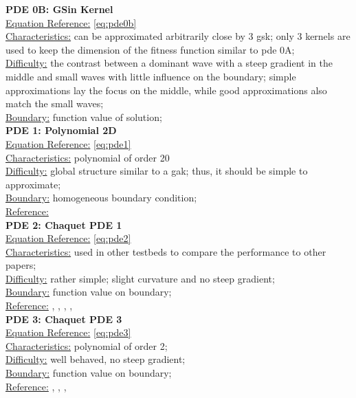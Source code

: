 \documentclass[./\jobname.tex]{subfiles}
\begin{document}
\textbf{PDE 0B: GSin Kernel} \\
\underline{Equation Reference:} \eqref{eq:pde0b} \\
\underline{Characteristics:} can be approximated arbitrarily close by 3 \gls{gsk}; only 3 kernels are used to keep the dimension of the fitness function similar to \gls{pde} 0A;\\
\underline{Difficulty:} the contrast between a dominant wave with a steep gradient in the middle and small waves with little influence on the boundary; simple approximations lay the focus on the middle, while good approximations also match the small waves; \\
\underline{Boundary:} function value of solution; \\

\textbf{PDE 1: Polynomial 2D} \\
\underline{Equation Reference:} \eqref{eq:pde1} \\
\underline{Characteristics:} polynomial of order 20 \\
\underline{Difficulty:} global structure similar to a \gls{gak}; thus, it should be simple to approximate; \\
\underline{Boundary:} homogeneous boundary condition; \\
\underline{Reference:} \cite{mitchell_nist_2018} \\

\textbf{PDE 2: Chaquet PDE 1} \\
\underline{Equation Reference:} \eqref{eq:pde2} \\
\underline{Characteristics:} used in other testbeds to compare the performance to other papers; \\
\underline{Difficulty:} rather simple; slight curvature and no steep gradient; \\
\underline{Boundary:} function value on boundary; \\
\underline{Reference:} \cite{chaquet_using_2019}, \cite{chaquet_solving_2012}, \cite{tsoulos_solving_2006}, \cite{sobester_genetic_2008}, \cite{panagant_solving_2014}\\

\textbf{PDE 3: Chaquet PDE 3} \\
\underline{Equation Reference:} \eqref{eq:pde3} \\
\underline{Characteristics:} polynomial of order 2; \\
\underline{Difficulty:} well behaved, no steep gradient; \\
\underline{Boundary:} function value on boundary; \\
\underline{Reference:} \cite{chaquet_using_2019}, \cite{chaquet_solving_2012}, \cite{tsoulos_solving_2006}, \cite{panagant_solving_2014} \\
\end{document}
